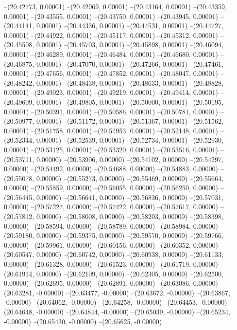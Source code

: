 --(20.42773, 0.00001)
--(20.42969, 0.00001)
--(20.43164, 0.00001)
--(20.43359, 0.00001)
--(20.43555, 0.00001)
--(20.43750, 0.00001)
--(20.43945, 0.00001)
--(20.44141, 0.00001)
--(20.44336, 0.00001)
--(20.44531, 0.00001)
--(20.44727, 0.00001)
--(20.44922, 0.00001)
--(20.45117, 0.00001)
--(20.45312, 0.00001)
--(20.45508, 0.00001)
--(20.45703, 0.00001)
--(20.45898, 0.00001)
--(20.46094, 0.00001)
--(20.46289, 0.00001)
--(20.46484, 0.00001)
--(20.46680, 0.00001)
--(20.46875, 0.00001)
--(20.47070, 0.00001)
--(20.47266, 0.00001)
--(20.47461, 0.00001)
--(20.47656, 0.00001)
--(20.47852, 0.00001)
--(20.48047, 0.00001)
--(20.48242, 0.00001)
--(20.48438, 0.00001)
--(20.48633, 0.00001)
--(20.48828, 0.00001)
--(20.49023, 0.00001)
--(20.49219, 0.00001)
--(20.49414, 0.00001)
--(20.49609, 0.00001)
--(20.49805, 0.00001)
--(20.50000, 0.00001)
--(20.50195, 0.00001)
--(20.50391, 0.00001)
--(20.50586, 0.00001)
--(20.50781, 0.00001)
--(20.50977, 0.00001)
--(20.51172, 0.00001)
--(20.51367, 0.00001)
--(20.51562, 0.00001)
--(20.51758, 0.00001)
--(20.51953, 0.00001)
--(20.52148, 0.00001)
--(20.52344, 0.00001)
--(20.52539, 0.00001)
--(20.52734, 0.00001)
--(20.52930, 0.00001)
--(20.53125, 0.00001)
--(20.53320, 0.00001)
--(20.53516, 0.00001)
--(20.53711, 0.00000)
--(20.53906, 0.00000)
--(20.54102, 0.00000)
--(20.54297, 0.00000)
--(20.54492, 0.00000)
--(20.54688, 0.00000)
--(20.54883, 0.00000)
--(20.55078, 0.00000)
--(20.55273, 0.00000)
--(20.55469, 0.00000)
--(20.55664, 0.00000)
--(20.55859, 0.00000)
--(20.56055, 0.00000)
--(20.56250, 0.00000)
--(20.56445, 0.00000)
--(20.56641, 0.00000)
--(20.56836, 0.00000)
--(20.57031, 0.00000)
--(20.57227, 0.00000)
--(20.57422, 0.00000)
--(20.57617, 0.00000)
--(20.57812, 0.00000)
--(20.58008, 0.00000)
--(20.58203, 0.00000)
--(20.58398, 0.00000)
--(20.58594, 0.00000)
--(20.58789, 0.00000)
--(20.58984, 0.00000)
--(20.59180, 0.00000)
--(20.59375, 0.00000)
--(20.59570, 0.00000)
--(20.59766, 0.00000)
--(20.59961, 0.00000)
--(20.60156, 0.00000)
--(20.60352, 0.00000)
--(20.60547, 0.00000)
--(20.60742, 0.00000)
--(20.60938, 0.00000)
--(20.61133, 0.00000)
--(20.61328, 0.00000)
--(20.61523, 0.00000)
--(20.61719, 0.00000)
--(20.61914, 0.00000)
--(20.62109, 0.00000)
--(20.62305, 0.00000)
--(20.62500, 0.00000)
--(20.62695, 0.00000)
--(20.62891, 0.00000)
--(20.63086, 0.00000)
--(20.63281, -0.00000)
--(20.63477, -0.00000)
--(20.63672, -0.00000)
--(20.63867, -0.00000)
--(20.64062, -0.00000)
--(20.64258, -0.00000)
--(20.64453, -0.00000)
--(20.64648, -0.00000)
--(20.64844, -0.00000)
--(20.65039, -0.00000)
--(20.65234, -0.00000)
--(20.65430, -0.00000)
--(20.65625, -0.00000)
